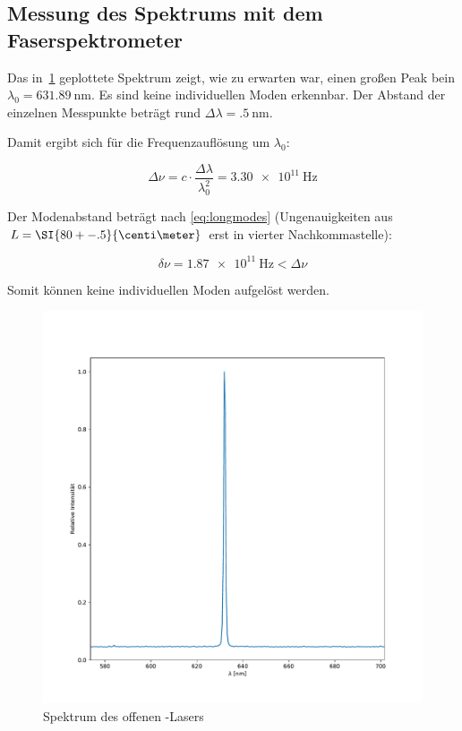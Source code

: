 \documentclass[slug=GL, room=HZDR\ Dresden/Rossendorf\,\ Geb.\ 620/123, supervisor=Tim\ Ziegler]{../../Lab_Report_LaTeX/lab_report}
\newcommand{\hne}{\ce{HeNe}-Laser}
\begin{document}
\subsection{Messung des Spektrums mit dem Faserspektrometer}
\label{sec:faserausw}

Das in~\ref{fig:faserspek} geplottete Spektrum zeigt, wie zu erwarten
war, einen gro\ss{}en Peak bein
\(\lambda_0=\SI{631.89}{\nano\meter}\). Es sind keine individuellen
Moden erkennbar. Der Abstand der einzelnen Messpunkte betr\"agt rund
\(\Delta\lambda=\SI{.5}{\nano\meter}\).

Damit ergibt sich f\"ur die Frequenzaufl\"osung um \(\lambda_0\):

\begin{equation}
  \Delta\nu=c\cdot\frac{\Delta\lambda}{\lambda_0^2}=\SI{3.30e11}{\hertz}
\end{equation}

Der Modenabstand betr\"agt nach \ref{eq:longmodes} (Ungenauigkeiten
aus \(L=\SI{80+-.5}{\centi\meter}\) erst in vierter Nachkommastelle):

\begin{equation}
  \label{eq:moda}
  \delta\nu = \SI{1.87e11}{\hertz} < \Delta\nu
\end{equation}

Somit k\"onnen keine individuellen Moden aufgel\"ost werden.
\begin{figure}[h]\centering
  \includegraphics[width=.8\columnwidth]{figs/faserspek.pdf}
  \caption{Spektrum des offenen \hne{}s}
  \label{fig:faserspek}
\end{figure}
\end{document}
